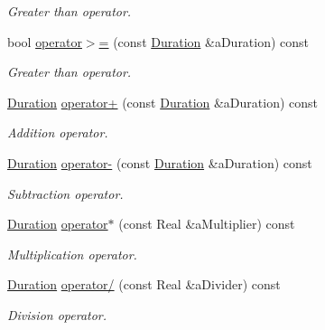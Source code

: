 \begin{DoxyCompactItemize}
\begin{DoxyCompactList}\small\item\em Greater than operator. \end{DoxyCompactList}\item 
bool \hyperlink{classlibrary_1_1physics_1_1time_1_1_duration_a4338d704712640124d44a6e7a52909ea}{operator$>$=} (const \hyperlink{classlibrary_1_1physics_1_1time_1_1_duration}{Duration} \&a\+Duration) const
\begin{DoxyCompactList}\small\item\em Greater than operator. \end{DoxyCompactList}\item 
\hyperlink{classlibrary_1_1physics_1_1time_1_1_duration}{Duration} \hyperlink{classlibrary_1_1physics_1_1time_1_1_duration_ae130ab9904fc08b9cf19b32510913350}{operator+} (const \hyperlink{classlibrary_1_1physics_1_1time_1_1_duration}{Duration} \&a\+Duration) const
\begin{DoxyCompactList}\small\item\em Addition operator. \end{DoxyCompactList}\item 
\hyperlink{classlibrary_1_1physics_1_1time_1_1_duration}{Duration} \hyperlink{classlibrary_1_1physics_1_1time_1_1_duration_a9d45bbc3db56c0163bb5d33c41888879}{operator-\/} (const \hyperlink{classlibrary_1_1physics_1_1time_1_1_duration}{Duration} \&a\+Duration) const
\begin{DoxyCompactList}\small\item\em Subtraction operator. \end{DoxyCompactList}\item 
\hyperlink{classlibrary_1_1physics_1_1time_1_1_duration}{Duration} \hyperlink{classlibrary_1_1physics_1_1time_1_1_duration_a6aea6dbe11b3199e63ee29a851c3fc16}{operator$\ast$} (const Real \&a\+Multiplier) const
\begin{DoxyCompactList}\small\item\em Multiplication operator. \end{DoxyCompactList}\item 
\hyperlink{classlibrary_1_1physics_1_1time_1_1_duration}{Duration} \hyperlink{classlibrary_1_1physics_1_1time_1_1_duration_aa1488a4b12024ff181631951758676be}{operator/} (const Real \&a\+Divider) const
\begin{DoxyCompactList}\small\item\em Division operator. \end{DoxyCompactList}\item 

\end{DoxyCompactItemize}
